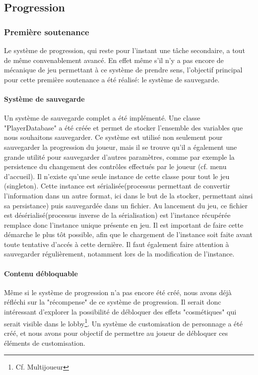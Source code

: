 \subsection{Progression}

	\subsubsection{Première soutenance}

        Le système de progression, qui reste pour l'instant une tâche secondaire, a tout de même convenablement avancé. En effet même s'il n'y a pas 
        encore de mécanique de jeu permettant à ce système de prendre sens, l'objectif principal pour cette première soutenance a été réalisé: le système 
        de sauvegarde.

        \paragraph{Système de sauvegarde}
        Un système de sauvegarde complet a été implémenté. Une classe "PlayerDatabase" a été créée et permet de stocker l'ensemble des variables que nous 
        souhaitons sauvegarder. Ce système est utilisé non seulement pour sauvegarder la progression du joueur, mais il se trouve qu'il a également une grande 
        utilité pour sauvegarder d'autres paramètres, comme par exemple la persistence du changement des contrôles effectués par le joueur (cf. menu d'accueil). 
        Il n'existe qu'une seule instance de cette classe pour tout le jeu (singleton). Cette instance est sérialisée(processus permettant de convertir 
        l'information dans un autre format, ici dans le but de la stocker, permettant ainsi sa persistance) puis sauvegardée dans un fichier. Au lancement du 
        jeu, ce fichier est désérialisé(processus inverse de la sérialisation) est l'instance récupérée remplace donc l'instance unique présente en jeu. Il est 
        important de faire cette démarche le plus tôt possible, afin que le chargement de l'instance soit faite avant toute tentative d'accés à cette dernière. 
        Il faut également faire attention à sauvegarder régulièrement, notamment lors de la modification de l'instance.

        \paragraph{Contenu débloquable}
        Même si le système de progression n'a pas encore été créé, nous avons déjà réfléchi sur la "récompense" de ce système de progression. Il serait donc 
        intéressant d'explorer la possibilité de débloquer des effets "cosmétiques" qui serait visible dans le lobby\footnote{Cf. Multijoueur}. Un système de 
        customisation de personnage a été créé, et nous avons pour objectif de permettre au joueur de débloquer ces éléments de customisation.


